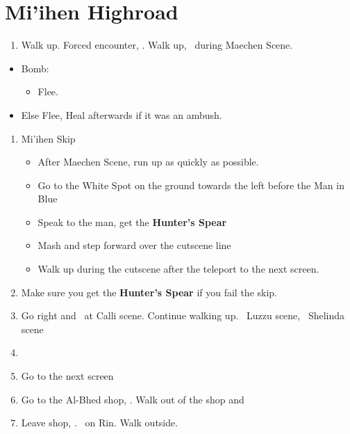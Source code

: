\chapter{Mi'ihen Highroad}

\begin{enumerate}
	\item Walk up. Forced encounter, \sd. Walk up, \sd\ during Maechen Scene.
\end{enumerate}
\begin{encounters}
	\begin{itemize}
		\item Bomb:
		      \begin{itemize}
			      \kimahrif Lancet Bomb, learn \textbf{Self Destruct}
			      \item Flee.
		      \end{itemize}
		\item Else Flee,  Heal afterwards if it was an ambush.
	\end{itemize}
\end{encounters}
\newpage
\begin{enumerate}[resume]
	\item {Mi'ihen Skip}
	      \begin{itemize}
		      \item After Maechen Scene, run up as quickly as possible.
		      \item Go to the White Spot on the ground towards the left before the Man in Blue
		      \item Speak to the man, get the \textbf{Hunter's Spear}
		      \item Mash and step forward over the cutscene line
		      \item Walk up during the cutscene after the teleport to the next screen.
	      \end{itemize}
	\item Make sure you get the \textbf{Hunter's Spear} if you fail the skip.
	\item Go right and \sd\ at Calli scene. Continue walking up. \sd\ Luzzu scene, \sd\ Shelinda scene
	\item \formation{\tidus}{\wakka}{\kimahri}
	\item Go to the next screen
	\item Go to the Al-Bhed shop, \sd. Walk out of the shop and \cs[5:30]
	\item Leave shop, \sd. \sd\ on Rin. Walk outside.
\end{enumerate}
